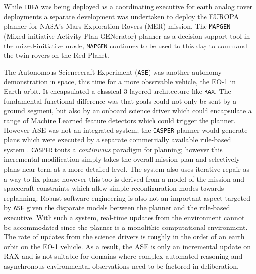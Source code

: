 While \texttt{IDEA} was being deployed as a coordinating executive for
earth analog rover deployments \cite{wetter05} a separate development
was undertaken to deploy the EUROPA planner for NASA’s Mars
Exploration Rovers (MER) mission. The \texttt{MAPGEN}
(Mixed-initiative Activity Plan GENerator) planner \cite{bresina03,
  aichang04, bresina05, bresina05a} as a decision support tool in the
mixed-initiative mode; \texttt{MAPGEN} continues to be used to this
day to command the twin rovers on the Red
Planet. %

The Autonomous Sciencecraft Experiment (\texttt{ASE}) \cite{chien99,
  chien03} was another autonomy demonstration in space, this time for
a more observable vehicle, the EO-1 in Earth orbit. It encapsulated a
classical 3-layered architecture like \texttt{RAX}. The fundamental
functional difference was that goals could not only be sent by a
ground segment, but also by an onboard science driver which could
encapsulate a range of Machine Learned feature detectors which could
trigger the planner. However ASE was not an integrated system; the
\texttt{CASPER} planner \cite{chien00} would generate plans which were
executed by a separate commercially available rule-based system
\cite{icl}. \texttt{CASPER} touts a \emph{continuous} paradigm for
planning; however this incremental modification simply takes the
overall mission plan and selectively plans near-term at a more
detailed level. The system also uses iterative-repair as a way to fix
plans; however this too is derived from a model of the mission and
spacecraft constraints which allow simple reconfiguration modes
towards replanning. Robust software engineering is also not an
important aspect targeted by \texttt{ASE} given the disparate models
between the planner and the rule-based executive. With such a system,
real-time updates from the environment cannot be accommodated since
the planner is a monolithic computational environment. The rate of
updates from the science drivers is roughly in the order of an earth
orbit on the EO-1 vehicle. As a result, the ASE is only an incremental
update on RAX and is not suitable for domains where complex automated
reasoning and asynchronous environmental observations need to be
factored in deliberation.

